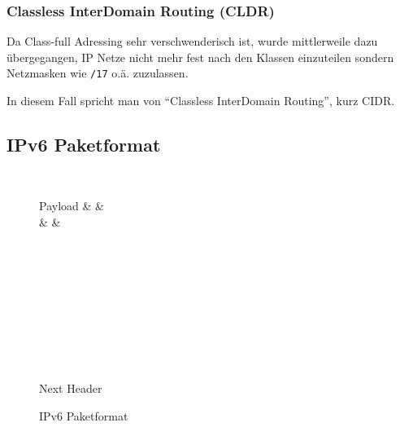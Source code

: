 		\subsubsection{Classless InterDomain Routing (CLDR)}
			Da Class-full Adressing sehr verschwenderisch ist, wurde mittlerweile dazu übergegangen, IP Netze nicht mehr fest nach den Klassen einzuteilen sondern Netzmasken wie \texttt{/17} o.ä. zuzulassen.

			In diesem Fall spricht man von \enquote{Classless InterDomain Routing}, kurz CIDR.

        \subsection{IPv6 Paketformat}
            \begin{figure}[H]
            	\centering
                \begin{bytefield}[bitwidth = 1.2em]{32}
		             \\
		            \begin{rightwordgroup}{Payload}
			             &  &  \\
			             &  &  \\
			             \\
			             \\
			             \\
			             \\
			             \\
			             \\
			             \\
			        \end{rightwordgroup} \\
		            \begin{rightwordgroup}{Next Header}
		            \end{rightwordgroup}
                \end{bytefield}
                \caption{IPv6 Paketformat}
                \label{fig:ipv6packet}
            \end{figure}

